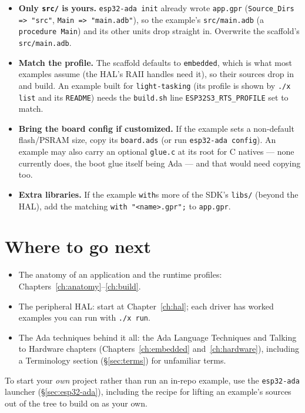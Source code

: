 \begin{itemize}
\item \textbf{Only \texttt{src/} is yours.} \texttt{esp32-ada init} already wrote
  \texttt{app.gpr} (\texttt{Source\_Dirs => "src"}, \texttt{Main => "main.adb"}),
  so the example's \texttt{src/main.adb} (a \texttt{procedure Main}) and its other
  units drop straight in. Overwrite the scaffold's \texttt{src/main.adb}.
\item \textbf{Match the profile.} The scaffold defaults to \texttt{embedded}, which
  is what most examples assume (the HAL's RAII handles need it), so their sources
  drop in and build. An example built for \texttt{light-tasking} (its profile is
  shown by \texttt{./x list} and its \texttt{README}) needs the \texttt{build.sh}
  line \texttt{ESP32S3\_RTS\_PROFILE} set to match.
\item \textbf{Bring the board config if customized.} If the example sets
  a non-default flash/PSRAM size, copy its \texttt{board.ads} (or run
  \texttt{esp32-ada config}). An example may also carry an optional
  \texttt{glue.c} at its root for C natives --- none currently does, the boot
  glue itself being Ada --- and that would need copying too.
\item \textbf{Extra libraries.} If the example \texttt{with}s more of the SDK's
  \texttt{libs/} (beyond the HAL), add the matching \texttt{with "<name>.gpr";} to
  \texttt{app.gpr}.
\end{itemize}


\section{Where to go next}

\begin{itemize}
\item The anatomy of an application and the runtime profiles:
  Chapters~\ref{ch:anatomy}--\ref{ch:build}.
\item The peripheral HAL: start at Chapter~\ref{ch:hal}; each driver has worked
  examples you can run with \texttt{./x run}.
\item The Ada techniques behind it all: the Ada Language Techniques and
  Talking to Hardware chapters (Chapters~\ref{ch:embedded}
  and~\ref{ch:hardware}), including a Terminology section (\S\ref{sec:terms})
  for unfamiliar terms.
\end{itemize}

To start your \emph{own} project rather than run an in-repo example, use the
\texttt{esp32-ada} launcher (\S\ref{sec:esp32-ada}), including the recipe for
lifting an example's sources out of the tree to build on as your own.
